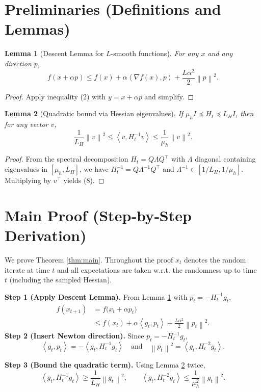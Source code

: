 \documentclass{article}
\newtheorem{lemma}{Lemma}
\newcommand{\norm}[1]{\left\|#1\right\|}
\newcommand{\inner}[1]{\left\langle #1 \right\rangle}
\begin{document}
\newpage
\section*{Preliminaries (Definitions and Lemmas)}
\begin{lemma}[Descent Lemma for $L$‑smooth functions]\label{lem:descent}
For any $x$ and any direction $p$,
\[
f(x+\alpha p)\le f(x)+\alpha\inner{\nabla f(x),p}+\frac{L\alpha^{2}}{2}\norm{p}^{2}.
\tag{7}
\]
\end{lemma}
\begin{proof}
Apply inequality (2) with $y=x+\alpha p$ and simplify. \hfill\qedsymbol
\end{proof}

\begin{lemma}[Quadratic bound via Hessian eigenvalues]\label{lem:hessian}
If $\mu_{\!h}I\preceq H_t\preceq L_{H}I$, then for any vector $v$,
\[
\frac{1}{L_{H}}\norm{v}^{2}\le \inner{v, H_t^{-1} v}\le \frac{1}{\mu_{\!h}}\norm{v}^{2}.
\tag{8}
\]
\end{lemma}
\begin{proof}
From the spectral decomposition $H_t=Q\Lambda Q^{\top}$ with $\Lambda$ diagonal containing eigenvalues in $[\mu_{\!h},L_{H}]$, we have $H_t^{-1}=Q\Lambda^{-1}Q^{\top}$ and $\Lambda^{-1}\in[1/L_{H},1/\mu_{\!h}]$. Multiplying by $v^{\top}$ yields (8). \hfill\qedsymbol
\end{proof}

\section*{Main Proof (Step‑by‑Step Derivation)}
We prove Theorem \ref{thm:main}.  Throughout the proof $x_t$ denotes the random iterate at time $t$ and all expectations are taken w.r.t. the randomness up to time $t$ (including the sampled Hessian).

\bigskip
\noindent\textbf{Step 1 (Apply Descent Lemma).}  
From Lemma \ref{lem:descent} with $p_t=-H_t^{-1}g_t$,
\begin{align}
f(x_{t+1})
&=f\bigl(x_t+\alpha p_t\bigr) \nonumber\\
&\le f(x_t)+\alpha\inner{g_t,p_t}
   +\frac{L\alpha^{2}}{2}\norm{p_t}^{2}. \tag{9}
\end{align}
\noindent\textbf{Step 2 (Insert Newton direction).}  
Since $p_t=-H_t^{-1}g_t$,
\[
\inner{g_t,p_t}= -\inner{g_t, H_t^{-1}g_t}
\quad\text{and}\quad
\norm{p_t}^{2}= \inner{g_t, H_t^{-2}g_t}.
\tag{10}
\]

\noindent\textbf{Step 3 (Bound the quadratic term).}  
Using Lemma \ref{lem:hessian} twice,
\[
\inner{g_t, H_t^{-1}g_t}\ge \frac{1}{L_{H}}\norm{g_t}^{2},
\qquad
\inner{g_t, H_t^{-2}g_t}\le \frac{1}{\mu_{\!h}^{2}}\norm{g_t}^{2}.
\tag{11}
\]
\end{document}
